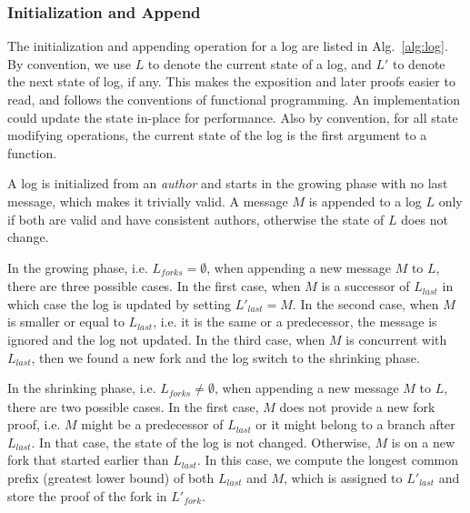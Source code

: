 \documentclass[9pt, oneside]{article}   	%
\begin{document}
\subsubsection{Initialization and Append}
\label{sec:design:log:appending}

The initialization and appending operation for a log are listed in Alg.~\ref{alg:log}. By convention, we use $L$ to denote the current state of a log, and $L'$ to denote the next state of log, if any. This makes the exposition and later proofs easier to read, and follows the conventions of functional programming. An implementation could update the state in-place for performance. Also by convention, for all state modifying operations, the current state of the log is the first argument to a function.

 A log is initialized from an \textit{author} and starts in the growing phase with no last message, which makes it trivially valid. A message $M$ is appended to a log $L$ only if both are valid and have consistent authors, otherwise the state of $L$ does not change. 

In the growing phase, i.e. $L_\textit{forks} = \emptyset$, when appending a new message $M$ to $L$, there are three possible cases. In the first case, when $M$ is a successor of $L_\textit{last}$ in which case the log is updated by setting $L'_\textit{last} = M$. In the second case, when $M$ is smaller or equal to $L_\textit{last}$, i.e. it is the same or a predecessor, the message is ignored and the log not updated. In the third case, when $M$ is concurrent with $L_\textit{last}$, then we found a new fork and the log switch to the shrinking phase.

In the shrinking phase, i.e. $L_\textit{forks} \neq \emptyset$, when appending a new message $M$ to $L$, there are two possible cases. In the first case, $M$ does not provide a new fork proof, i.e. $M$ might be a predecessor of $L_\textit{last}$ or it might belong to a branch after $L_\textit{last}$. In that case, the state of the log is not changed. Otherwise, $M$ is on a new fork that started earlier than $L_\textit{last}$. In this case, we compute the longest common prefix (greatest lower bound) of both $L_\textit{last}$ and $M$, which is assigned to $L'_\textit{last}$ and store the proof of the fork in $L'_\textit{fork}$.
\end{document}
